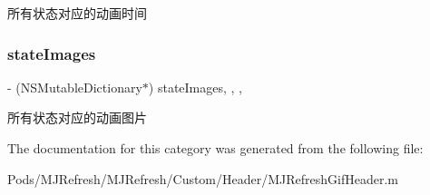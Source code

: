 所有状态对应的动画时间 \mbox{\label{category_m_j_refresh_gif_header_07_08_a0e1525cef10052616245900e4f0826b3}} 
\subsubsection{\texorpdfstring{state\+Images}{stateImages}}
{\footnotesize\ttfamily -\/ (N\+S\+Mutable\+Dictionary$\ast$) state\+Images\hspace{0.3cm}{\ttfamily [read]}, {\ttfamily [write]}, {\ttfamily [nonatomic]}, {\ttfamily [strong]}}

所有状态对应的动画图片 

The documentation for this category was generated from the following file\+:\begin{DoxyCompactItemize}
\item 
Pods/\+M\+J\+Refresh/\+M\+J\+Refresh/\+Custom/\+Header/M\+J\+Refresh\+Gif\+Header.\+m\end{DoxyCompactItemize}
